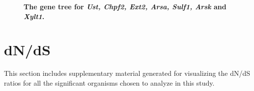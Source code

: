 \documentclass{article}
\begin{document}
\begin{figure}[H]
\centering
{}
\caption{\textbf{The gene tree for \textit{Ust, Chpf2, Ext2, Arsa, Sulf1, Arsk} and \textit{Xylt1}.}}
\label{sup_fig_18}
\end{figure}

\section{dN/dS}
This section includes supplementary material generated for visualizing the dN/dS ratios for all the significant organisms chosen to analyze in this study.
\end{document}
